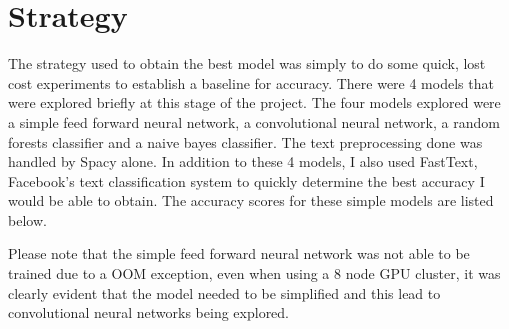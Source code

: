 \section{Strategy}
The strategy used to obtain the best model was simply to do some quick, lost cost experiments to establish a baseline 
for accuracy. There were 4 models that were explored briefly at this stage of the project. The four models explored were a simple feed forward neural network, a convolutional neural network, a random forests classifier and a naive bayes classifier. 
The text preprocessing done was handled by Spacy alone. In addition to these 4 models, I also used FastText, Facebook's text classification system to quickly determine the best accuracy I would be able to obtain. 
The accuracy scores for these simple models are listed below. 
\vspace{3pt}

\vspace{3pt}

Please note that the simple feed forward neural network was not able to be trained due to a OOM exception, even when using a 8 node GPU cluster, it was clearly evident that the model 
needed to be simplified and this lead to convolutional neural networks being explored.
